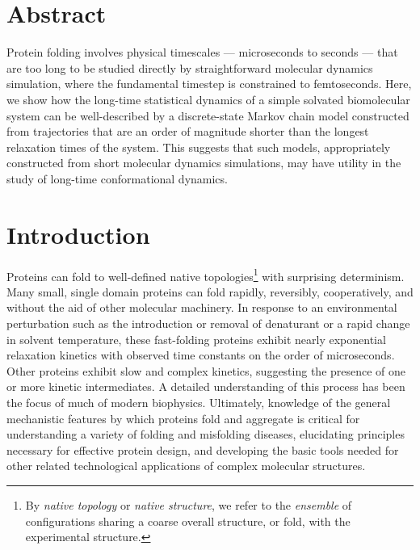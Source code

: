 \section*{Abstract}

Protein folding involves physical timescales --- microseconds to seconds --- that are too long to be studied directly by straightforward molecular dynamics simulation, where the fundamental timestep is constrained to femtoseconds.
Here, we show how the long-time statistical dynamics of a simple solvated biomolecular system can be well-described by a discrete-state Markov chain model constructed from trajectories that are an order of magnitude shorter than the longest relaxation times of the system.
This suggests that such models, appropriately constructed from short molecular dynamics simulations, may have utility in the study of long-time conformational dynamics.

\section{Introduction}

Proteins can fold to well-defined native topologies\footnote{By \emph{native topology} or \emph{native structure}, we refer to the \emph{ensemble} of configurations sharing a coarse overall structure, or fold, with the experimental structure.} with surprising determinism.
Many small, single domain proteins can fold rapidly, reversibly, cooperatively, and without the aid of other molecular machinery.
In response to an environmental perturbation such as the introduction or removal of denaturant or a rapid change in solvent temperature, these fast-folding proteins exhibit nearly exponential relaxation kinetics with observed time constants on the order of microseconds.
Other proteins exhibit slow and complex kinetics, suggesting the presence of one or more kinetic intermediates.  
A detailed understanding of this process has been the focus of much of modern biophysics.
Ultimately, knowledge of the general mechanistic features by which proteins fold and aggregate is critical for understanding a variety of folding and misfolding diseases, elucidating principles necessary for effective protein design, and developing the basic tools needed for other related technological applications of complex molecular structures.

